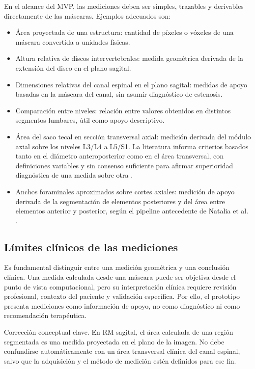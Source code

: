 En el alcance del MVP, las mediciones deben ser simples, trazables y derivables directamente de las máscaras. Ejemplos adecuados son:

\begin{itemize}
  \item Área proyectada de una estructura: cantidad de píxeles o vóxeles de una máscara convertida a unidades físicas.
  \item Altura relativa de discos intervertebrales: medida geométrica derivada de la extensión del disco en el plano sagital.
  \item Dimensiones relativas del canal espinal en el plano sagital: medidas de apoyo basadas en la máscara del canal, sin asumir diagnóstico de estenosis.
  \item Comparación entre niveles: relación entre valores obtenidos en distintos segmentos lumbares, útil como apoyo descriptivo.
  \item Área del saco tecal en sección transversal axial: medición derivada del módulo axial sobre los niveles L3/L4 a L5/S1. La literatura informa criterios basados tanto en el diámetro anteroposterior como en el área transversal, con definiciones variables y sin consenso suficiente para afirmar superioridad diagnóstica de una medida sobre otra \parencite{steurer_lumbar_stenosis_2011}.
  \item Anchos foraminales aproximados sobre cortes axiales: medición de apoyo derivada de la segmentación de elementos posteriores y del área entre elementos anterior y posterior, según el pipeline antecedente de Natalia et al. \parencite{natalia_measurement_2020}.
\end{itemize}

\subsection{Límites clínicos de las mediciones}

Es fundamental distinguir entre una medición geométrica y una conclusión clínica. Una medida calculada desde una máscara puede ser objetiva desde el punto de vista computacional, pero su interpretación clínica requiere revisión profesional, contexto del paciente y validación específica. Por ello, el prototipo presenta mediciones como información de apoyo, no como diagnóstico ni como recomendación terapéutica.

Corrección conceptual clave. En RM sagital, el área calculada de una región segmentada es una medida proyectada en el plano de la imagen. No debe confundirse automáticamente con un área transversal clínica del canal espinal, salvo que la adquisición y el método de medición estén definidos para ese fin.

